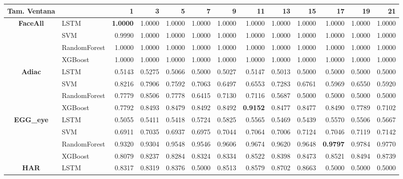 \begin{table}[h]
\centering
\begin{adjustbox}{max width=15cm}
\begin{tabular}{|c|l|r|r|r|r|r|r|r|r|r|r|r|}
				\hline
				\textbf{Tam. Ventana}&         &      1  &      3  &      5  &      7  &      9  &      11 &      13 &      15 &      17 &      19 &      21 \\
				\hline
				\textbf{FaceAll} & LSTM &  \textbf{1.0000} &  1.0000 &  1.0000 &  1.0000 &  1.0000 &  1.0000 &  1.0000 &  1.0000 &  1.0000 &  1.0000 &  1.0000 \\
				& SVM &  0.9990 &  1.0000 &  1.0000 &  1.0000 &  1.0000 &  1.0000 &  1.0000 &  1.0000 &  1.0000 &  1.0000 &  1.0000 \\
				& RandomForest &  1.0000 &  1.0000 &  1.0000 &  1.0000 &  1.0000 &  1.0000 &  1.0000 &  1.0000 &  1.0000 &  1.0000 &  1.0000 \\
				& XGBoost &  1.0000 &  1.0000 &  1.0000 &  1.0000 &  1.0000 &  1.0000 &  1.0000 &  1.0000 &  1.0000 &  1.0000 &  1.0000 \\
				\hline
				\textbf{Adiac} & LSTM &  0.5143 &  0.5275 &  0.5066 &  0.5000 &  0.5027 &  0.5147 &  0.5013 &  0.5000 &  0.5000 &  0.5000 &  0.5000 \\
				& SVM &  0.8216 &  0.7906 &  0.7592 &  0.7063 &  0.6497 &  0.6553 &  0.7283 &  0.6761 &  0.5969 &  0.6550 &  0.5920 \\
				& RandomForest &  0.7779 &  0.8506 &  0.7778 &  0.6415 &  0.7130 &  0.7116 &  0.5687 &  0.5000 &  0.5000 &  0.5000 &  0.5000 \\
				& XGBoost &  0.7792 &  0.8493 &  0.8479 &  0.8492 &  0.8492 &  \textbf{0.9152} &  0.8477 &  0.8477 &  0.8490 &  0.7789 &  0.7102 \\
				\hline
				\textbf{EGG\_eye} & LSTM &  0.5055 &  0.5411 &  0.5418 &  0.5724 &  0.5825 &  0.5565 &  0.5469 &  0.5439 &  0.5570 &  0.5506 &  0.5667 \\
				& SVM &  0.6911 &  0.7035 &  0.6937 &  0.6975 &  0.7044 &  0.7064 &  0.7006 &  0.7124 &  0.7046 &  0.7119 &  0.7142 \\
				& RandomForest &  0.9320 &  0.9304 &  0.9548 &  0.9546 &  0.9606 &  0.9674 &  0.9620 &  0.9648 &  \textbf{0.9797} &  0.9784 &  0.9770 \\
				& XGBoost &  0.8079 &  0.8237 &  0.8284 &  0.8324 &  0.8334 &  0.8522 &  0.8398 &  0.8473 &  0.8521 &  0.8494 &  0.8739 \\
				\hline
				\textbf{HAR} & LSTM &  0.8317 &  0.8319 &  0.8376 &  0.5000 &  0.8513 &  0.8579 &  0.8702 &  0.8663 &  0.5000 &  0.5000 &  0.5000 \\

\end{tabular}
\end{adjustbox}
\end{table}
